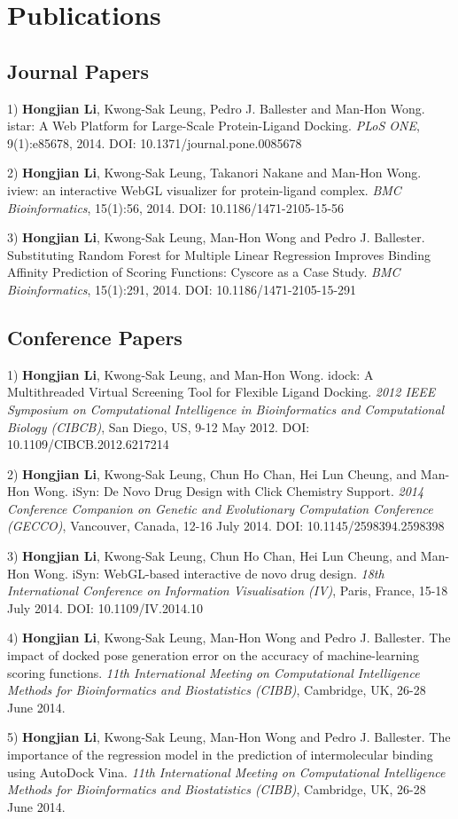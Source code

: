 \chapter{Publications}

\section{Journal Papers}

1) \textbf{Hongjian Li}, Kwong-Sak Leung, Pedro J. Ballester and Man-Hon Wong. istar: A Web Platform for Large-Scale Protein-Ligand Docking. \textit{PLoS ONE}, 9(1):e85678, 2014. DOI: 10.1371/journal.pone.0085678

2) \textbf{Hongjian Li}, Kwong-Sak Leung, Takanori Nakane and Man-Hon Wong. iview: an interactive WebGL visualizer for protein-ligand complex. \textit{BMC Bioinformatics}, 15(1):56, 2014. DOI: 10.1186/1471-2105-15-56

3) \textbf{Hongjian Li}, Kwong-Sak Leung, Man-Hon Wong and Pedro J. Ballester. Substituting Random Forest for Multiple Linear Regression Improves Binding Affinity Prediction of Scoring Functions: Cyscore as a Case Study. \textit{BMC Bioinformatics}, 15(1):291, 2014. DOI: 10.1186/1471-2105-15-291

\section{Conference Papers}

1) \textbf{Hongjian Li}, Kwong-Sak Leung, and Man-Hon Wong. idock: A Multithreaded Virtual Screening Tool for Flexible Ligand Docking. \textit{2012 IEEE Symposium on Computational Intelligence in Bioinformatics and Computational Biology (CIBCB)}, San Diego, US, 9-12 May 2012. DOI: 10.1109/CIBCB.2012.6217214

2) \textbf{Hongjian Li}, Kwong-Sak Leung, Chun Ho Chan, Hei Lun Cheung, and Man-Hon Wong. iSyn: De Novo Drug Design with Click Chemistry Support. \textit{2014 Conference Companion on Genetic and Evolutionary Computation Conference (GECCO)}, Vancouver, Canada, 12-16 July 2014. DOI: 10.1145/2598394.2598398

3) \textbf{Hongjian Li}, Kwong-Sak Leung, Chun Ho Chan, Hei Lun Cheung, and Man-Hon Wong. iSyn: WebGL-based interactive de novo drug design. \textit{18th International Conference on Information Visualisation (IV)}, Paris, France, 15-18 July 2014. DOI: 10.1109/IV.2014.10

4) \textbf{Hongjian Li}, Kwong-Sak Leung, Man-Hon Wong and Pedro J. Ballester. The impact of docked pose generation error on the accuracy of machine-learning scoring functions. \textit{11th International Meeting on Computational Intelligence Methods for Bioinformatics and Biostatistics (CIBB)}, Cambridge, UK, 26-28 June 2014.

5) \textbf{Hongjian Li}, Kwong-Sak Leung, Man-Hon Wong and Pedro J. Ballester. The importance of the regression model in the prediction of intermolecular binding using AutoDock Vina. \textit{11th International Meeting on Computational Intelligence Methods for Bioinformatics and Biostatistics (CIBB)}, Cambridge, UK, 26-28 June 2014.

\chapterend
